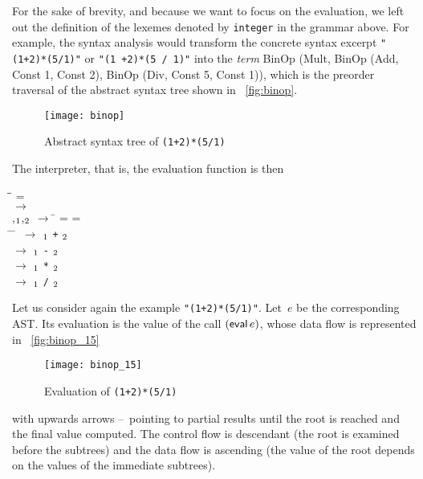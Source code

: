 For the sake of brevity, and because we want to focus on the
evaluation, we left out the definition of the lexemes denoted by
\texttt{integer} in the grammar above. For example, the syntax
analysis would transform the concrete syntax excerpt
\texttt{"(1+2)*(5/1)"} or \texttt{"(1 +2)*(5 / 1)"} into the
\emph{term} \textsf{BinOp (Mult, BinOp (Add, Const 1, Const 2), BinOp
  (Div, Const 5, Const 1))}, which is the preorder traversal of the
abstract syntax tree shown in \fig~\vref{fig:binop}.
\begin{figure}[b]
\centering
\texttt{[image: binop]}
\caption{Abstract syntax tree of \texttt{(1+2)*(5/1)}
\label{fig:binop}}
\end{figure}

The interpreter, that is, the evaluation function
is then
\begin{tabbing}
\Xlet \= \Xrec \=   = \Xmatch
  \Xwith\\
 \>   \(\rightarrow\) \\
 \vbar \> 
 \lpar{},\(\sb{1}\),\(\sb{2}\)\rpar{}
 \(\rightarrow\) \= \Xlet {} = 
 \Xand  {} = \\
 \> \> \Xin \= \Xmatch {} \Xwith \= \;\,  \(\rightarrow\)
 \(\sb{1}\) \texttt{+} \(\sb{2}\)\\
 \> \> \> \> \vbar  {} \(\rightarrow\)
 \(\sb{1}\) \texttt{-} \(\sb{2}\)\\
 \> \> \> \> \vbar {} \(\rightarrow\) 
 \(\sb{1}\) \texttt{*} \(\sb{2}\)\\
 \> \> \> \> \vbar {} \(\rightarrow\)
 \(\sb{1}\) \texttt{/} \(\sb{2}\)
\end{tabbing}
Let us consider again the example \texttt{"(1+2)*(5/1)"}. Let~$e$ be
the corresponding AST. Its evaluation is the value of the call
$(\textsf{eval} \, e)$, whose data flow is represented in
\fig~\vref{fig:binop_15}
\begin{figure}
\centering
\texttt{[image: binop\_15]}
\caption{Evaluation of \texttt{(1+2)*(5/1)}
\label{fig:binop_15}}
\end{figure}
with upwards arrows --~pointing to partial results until the root is
reached and the final value computed. The control flow is descendant
(the root is examined before the subtrees) and the data flow is
ascending (the value of the root depends on the values of the
immediate subtrees).

